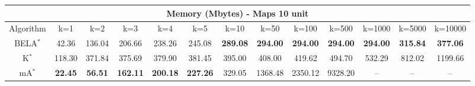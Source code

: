 \begin{tabular}{c|cccccccccccc}\toprule
\multicolumn{13}{c}{Memory (Mbytes) - Maps 10 unit}\\ \midrule
Algorithm & k=1 & k=2 & k=3 & k=4 & k=5 & k=10 & k=50 & k=100 & k=500 & k=1000 & k=5000 & k=10000 \\ \midrule
BELA$^*$ & 42.36 & 136.04 & 206.66 & 238.26 & 245.08 & \textbf{289.08} & \textbf{294.00} & \textbf{294.00} & \textbf{294.00} & \textbf{294.00} & \textbf{315.84} & \textbf{377.06} \\
K$^*$ & 118.30 & 371.84 & 375.69 & 379.90 & 381.45 & 395.00 & 408.00 & 419.62 & 494.70 & 532.29 & 812.02 & 1199.66 \\
mA$^*$ & \textbf{22.45} & \textbf{56.51} & \textbf{162.11} & \textbf{200.18} & \textbf{227.26} & 329.05 & 1368.48 & 2350.12 & 9328.20 & -- & -- & -- \\ \bottomrule 
\end{tabular}
